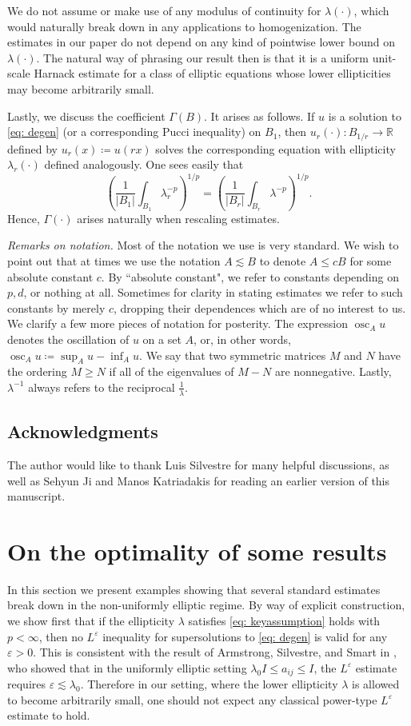 \documentclass[reqno]{amsart}
\numberwithin{equation}{section}
\numberwithin{equation}{section}
\newcommand{\R}{\mathbb R}
\newcommand{\eps}{\varepsilon}
\newcommand{\ds}{\displaystyle}
\DeclareMathOperator*{\osc}{osc}
\begin{document}
We do not assume or make use of any modulus of continuity for $\lambda(\cdot)$, which would naturally break down in any applications to homogenization. The estimates in our paper do not depend on any kind of pointwise lower bound on $\lambda(
\cdot)$. The natural way of phrasing our result then is that it is a uniform unit-scale Harnack estimate for a class of elliptic equations whose lower ellipticities may become arbitrarily small.

Lastly, we discuss the coefficient $\Gamma(B)$. It arises as follows. If $u$ is a solution to \eqref{eq: degen} (or a corresponding Pucci inequality) on $B_1$, then $u_r(\cdot):B_{1/r} \to \R$ defined by $u_r(x)\coloneqq u(rx)$ solves the corresponding equation with ellipticity $\lambda_r(\cdot)$ defined analogously. One sees easily that
$$\left(\frac{1}{|B_1|}\int_{B_1}\lambda_r^{-p}\right)^{1/p} = \left(\frac{1}{|B_r|}\int_{B_r} \lambda^{-p}\right)^{1/p}.$$
Hence, $\Gamma(\cdot)$ arises naturally when rescaling estimates. 
\\\par
\textit{Remarks on notation.}
Most of the notation we use is very standard. We wish to point out that at times we use the notation $A \lesssim B$ to denote $A \le cB$ for some absolute constant $c$. By ``absolute constant", we refer to constants depending on $p,d$, or nothing at all. Sometimes for clarity in stating estimates we refer to such constants by merely $c$, dropping their dependences which are of no interest to us. We clarify a few more pieces of notation for posterity. The expression $\ds \osc_A u$ denotes the oscillation of $u$ on a set $A$, or, in other words, $\ds \osc_A u \coloneqq \sup_A u - \inf_A u.$ We say that two symmetric matrices $M$ and $N$ have the ordering $M \ge N$ if all of the eigenvalues of $M -N$ are nonnegative. Lastly, $\lambda^{-1}$ always refers to the reciprocal $ \frac1\lambda$. 
\subsection{Acknowledgments}
The author would like to thank Luis Silvestre for many helpful discussions, as well as Sehyun Ji and Manos Katriadakis for reading an earlier version of this manuscript.
\section{On the optimality of some results}
\label{sec: optimality}
In this section we present examples showing that several standard estimates break down in the non-uniformly elliptic regime. By way of explicit construction, we show first that if the ellipticity $\lambda$ satisfies \eqref{eq: keyassumption} holds with $p<\infty$, then no $L^\eps$ inequality for supersolutions to \eqref{eq: degen} is valid for any $\eps>0$. This is consistent with the result of Armstrong, Silvestre, and Smart in \cite{ArmstrongSilvestreSmart2012}, who showed that in the uniformly elliptic setting $\lambda_0I \le a_{ij} \le I$, the $L^\eps$ estimate requires $\eps \lesssim \lambda_0$. Therefore in our setting, where the lower ellipticity $\lambda$ is allowed to become arbitrarily small, one should not expect any classical power-type $L^\eps$ estimate to hold.
\end{document}
